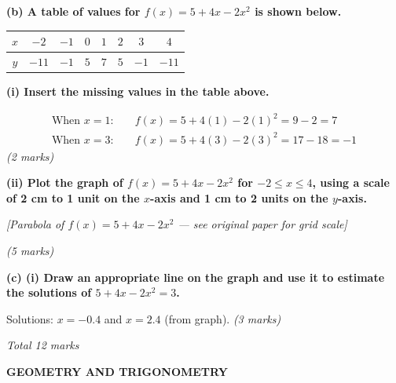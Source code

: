 \documentclass[12pt,a4paper]{article}
\newcommand{\subhead}[1]{\vspace{0.3em}\noindent\textbf{#1}\par}
\newcommand{\qmarks}[1]{\hfill\textit{(#1)}}
\begin{document}
\subhead{(b) A table of values for $f(x) = 5 + 4x - 2x^2$ is shown below.}

\begin{center}
\begin{tabular}{|c|c|c|c|c|c|c|c|}
\hline
$x$ & $-2$ & $-1$ & $0$ & $1$ & $2$ & $3$ & $4$ \\ \hline
$y$ & $-11$ & $-1$ & $5$ & $7$ & $5$ & $-1$ & $-11$ \\ \hline
\end{tabular}
\end{center}

\subhead{(i) Insert the missing values in the table above.}
\begin{align*}
\text{When } x = 1: &\quad f(x) = 5 + 4(1) - 2(1)^2 = 9 - 2 = 7 \\
\text{When } x = 3: &\quad f(x) = 5 + 4(3) - 2(3)^2 = 17 - 18 = -1
\end{align*}
\qmarks{2 marks}

\subhead{(ii) Plot the graph of $f(x) = 5 + 4x - 2x^2$ for $-2 \le x \le 4$, using a scale of 2 cm to 1 unit on the $x$-axis and 1 cm to 2 units on the $y$-axis.}

\begin{center}
\end{center}

\begin{center}\itshape [Parabola of $f(x) = 5 + 4x - 2x^2$ --- see original paper for grid scale]\end{center}
\qmarks{5 marks}

\subhead{(c) (i) Draw an appropriate line on the graph and use it to estimate the solutions of $5 + 4x - 2x^2 = 3$.}

Solutions: $x = -0.4$ and $x = 2.4$ (from graph).
\qmarks{3 marks}

\hfill\textit{Total 12 marks}

\newpage
\begin{center}
\textbf{GEOMETRY AND TRIGONOMETRY}
\end{center}
\end{document}
